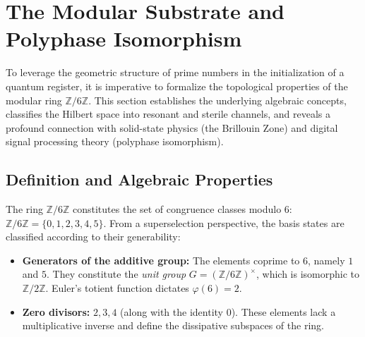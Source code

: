 \documentclass[reprint,aps,pra,superscriptaddress,nofootinbib]{revtex4-2}
\theoremstyle{plain}
\theoremstyle{definition}
\theoremstyle{remark}
\begin{document}
\section{The Modular Substrate and Polyphase Isomorphism}
\label{sec:sustrato_modular}

To leverage the geometric structure of prime numbers in the initialization of a quantum register, it is imperative to formalize the topological properties of the modular ring $\mathbb{Z}/6\mathbb{Z}$. This section establishes the underlying algebraic concepts, classifies the Hilbert space into resonant and sterile channels, and reveals a profound connection with solid-state physics (the Brillouin Zone) and digital signal processing theory (polyphase isomorphism).

\subsection{Definition and Algebraic Properties}

The ring $\mathbb{Z}/6\mathbb{Z}$ constitutes the set of congruence classes modulo 6: $\mathbb{Z}/6\mathbb{Z} = \{0,1,2,3,4,5\}$. From a superselection perspective, the basis states are classified according to their generability:
\begin{itemize}
    \item \textbf{Generators of the additive group:} The elements coprime to 6, namely $1$ and $5$. They constitute the \textit{unit group} $G = (\mathbb{Z}/6\mathbb{Z})^{\times}$, which is isomorphic to $\mathbb{Z}/2\mathbb{Z}$. Euler's totient function dictates $\varphi(6)=2$.
    \item \textbf{Zero divisors:} $2,3,4$ (along with the identity $0$). These elements lack a multiplicative inverse and define the dissipative subspaces of the ring.
\end{itemize}
\end{document}
